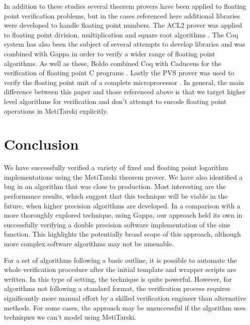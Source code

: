 \documentclass{fac}
\begin{document}
In addition to these studies several theorem provers have been applied to floating point verification problems, but in the cases referenced here additional libraries were developed to handle floating point numbers. The ACL2 prover was applied to floating point division, multiplication and square root algorithms \cite{russinoff1998mechanically,moore1996mechanically}. The Coq system has also been the subject of several attempts to develop libraries \cite{daumas2001generic,melquiond2012floating,boldo2011flocq} and was combined with Gappa \cite{boldo2009combining,daumas2010certification} in order to verify a wider range of floating point algorithms. As well as these, Boldo combined Coq with Caduceus for the verification of floating point C programs \cite{boldo2007formal}. Lastly the PVS prover was used to verify the floating point unit of a complete microprocessor \cite{jacobi2005formal}. In general, the main difference between this paper and those referenced above is that we target higher level algorithms for verification and don't attempt to encode floating point operations in MetiTarski explicitly. 

\section{Conclusion}
\label{Conclusion}
We have successfully verified a variety of fixed and floating point logarithm implementations using the MetiTarski theorem prover.
We have also identified a bug in an algorithm that was close to production. Most interesting are the performance results, which suggest that this technique will be viable in the future, when higher precision algorithms are developed. In a comparison with a more thoroughly explored technique, using Gappa, our approach held its own in successfully verifying a double precision software implementation of the sine function. This highlights the potentially broad scope of this approach, although more complex software algorithms may not be amenable. 

For a set of algorithms following a basic outline, it is possible to automate the whole verification procedure after the initial template and wrapper scripts are written. In this type of setting, the technique is quite powerful. However, for algorithms not following a standard format, the verification process requires significantly more manual effort by a skilled verification engineer than alternative methods. For some cases, the approach may be unsuccessful if the algorithm uses techniques we can't model using MetiTarski. 
\end{document}
